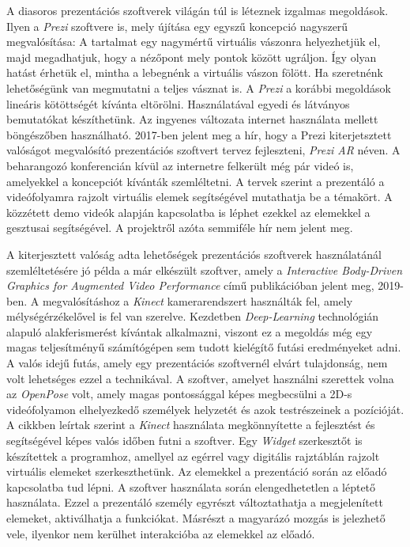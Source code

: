 A diasoros prezentációs szoftverek világán túl is léteznek izgalmas megoldások. 
Ilyen a \textit{Prezi} szoftvere is, mely újítása egy egyszű koncepció nagyszerű megvalósítása: A tartalmat egy nagymértű virtuális vászonra helyezhetjük el, majd megadhatjuk, hogy a nézőpont mely pontok között ugráljon. Így olyan hatást érhetük el, mintha a lebegnénk a virtuális vászon fölött. Ha szeretnénk lehetőségünk van megmutatni a teljes vásznat is. A \textit{Prezi} a korábbi megoldások lineáris kötöttségét kívánta eltörölni. Használatával egyedi és látványos bemutatókat készíthetünk. Az ingyenes változata internet használata mellett böngészőben használható.
2017-ben jelent meg a hír, hogy a Prezi kiterjetsztett valóságot megvalósító prezentációs szoftvert tervez fejleszteni, \textit{Prezi AR} néven. A beharangozó konferencián kívül az internetre felkerült még pár videó is, amelyekkel a koncepciót kívánták szemléltetni. A tervek szerint a prezentáló a videófolyamra rajzolt virtuális elemek segítségével mutathatja be a témakört. A közzétett demo videók alapján kapcsolatba is léphet ezekkel az elemekkel a gesztusai segítségével. A projektről azóta semmiféle hír nem jelent meg.

A kiterjesztett valóság adta lehetőségek prezentációs szoftverek használatánál szemléltetésére jó példa a már elkészült szoftver, amely a \textit{Interactive Body-Driven Graphics for Augmented Video Performance} című publikációban jelent meg, 2019-ben. \cite{saquib2019interactive}
A megvalósításhoz a \textit{Kinect} kamerarendszert használták fel, amely mélységérzékelővel is fel van szerelve.
Kezdetben \textit{Deep-Learning} technológián alapuló alakferismerést kívántak alkalmazni, viszont ez a megoldás még egy magas teljesítményű számítógépen sem tudott kielégítő futási eredményeket adni. A valós idejű futás, amely egy prezentációs szoftvernél elvárt tulajdonság, nem volt lehetséges ezzel a technikával. A szoftver, amelyet használni szerettek volna az \textit{OpenPose} volt, amely magas pontossággal képes megbecsülni a 2D-s videófolyamon elhelyezkedő személyek helyzetét és azok testrészeinek a pozícióját. \cite{cao2018openpose}
A cikkben leírtak szerint a \textit{Kinect} használata megkönnyítette a fejlesztést és segítségével képes valós időben futni a szoftver.
Egy \textit{Widget} szerkesztőt is készítettek a programhoz, amellyel az egérrel vagy digitális rajztáblán rajzolt virtuális elemeket szerkeszthetünk. Az elemekkel a prezentáció során az előadó kapcsolatba tud lépni. A szoftver használata során elengedhetetlen a léptető használata. Ezzel a prezentáló személy egyrészt változtathatja a megjelenített elemeket, aktiválhatja a funkciókat. Másrészt a magyarázó mozgás is jelezhető vele, ilyenkor nem kerülhet interakcióba az elemekkel az előadó.

